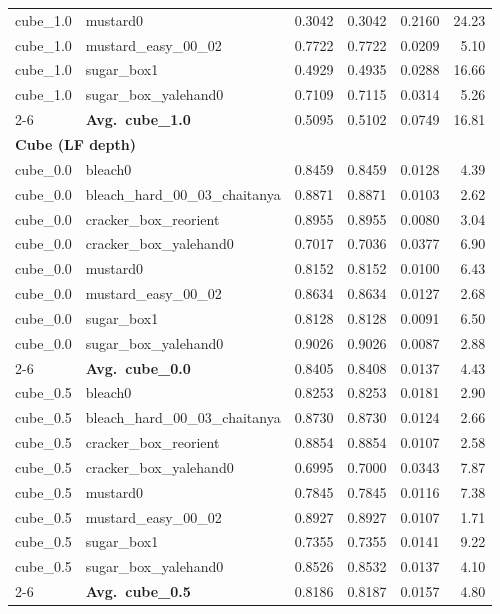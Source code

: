 \begin{longtable}{llrrrr}
  cube_1.0 & mustard0 & 0.3042 & 0.3042 & 0.2160 & 24.23 \\
  cube_1.0 & mustard\_easy\_00\_02 & 0.7722 & 0.7722 & 0.0209 & 5.10 \\
  cube_1.0 & sugar\_box1 & 0.4929 & 0.4935 & 0.0288 & 16.66 \\
  cube_1.0 & sugar\_box\_yalehand0 & 0.7109 & 0.7115 & 0.0314 & 5.26 \\
  \cmidrule{2-6}
  & \textbf{Avg.~cube_1.0} & 0.5095 & 0.5102 & 0.0749 & 16.81 \\
  \midrule
\multicolumn{6}{l}{\textbf{Cube (LF depth)}} \\
\midrule
  cube_0.0 & bleach0 & 0.8459 & 0.8459 & 0.0128 & 4.39 \\
  cube_0.0 & bleach\_hard\_00\_03\_chaitanya & 0.8871 & 0.8871 & 0.0103 & 2.62 \\
  cube_0.0 & cracker\_box\_reorient & 0.8955 & 0.8955 & 0.0080 & 3.04 \\
  cube_0.0 & cracker\_box\_yalehand0 & 0.7017 & 0.7036 & 0.0377 & 6.90 \\
  cube_0.0 & mustard0 & 0.8152 & 0.8152 & 0.0100 & 6.43 \\
  cube_0.0 & mustard\_easy\_00\_02 & 0.8634 & 0.8634 & 0.0127 & 2.68 \\
  cube_0.0 & sugar\_box1 & 0.8128 & 0.8128 & 0.0091 & 6.50 \\
  cube_0.0 & sugar\_box\_yalehand0 & 0.9026 & 0.9026 & 0.0087 & 2.88 \\
  \cmidrule{2-6}
  & \textbf{Avg.~cube_0.0} & 0.8405 & 0.8408 & 0.0137 & 4.43 \\
  \midrule
  cube_0.5 & bleach0 & 0.8253 & 0.8253 & 0.0181 & 2.90 \\
  cube_0.5 & bleach\_hard\_00\_03\_chaitanya & 0.8730 & 0.8730 & 0.0124 & 2.66 \\
  cube_0.5 & cracker\_box\_reorient & 0.8854 & 0.8854 & 0.0107 & 2.58 \\
  cube_0.5 & cracker\_box\_yalehand0 & 0.6995 & 0.7000 & 0.0343 & 7.87 \\
  cube_0.5 & mustard0 & 0.7845 & 0.7845 & 0.0116 & 7.38 \\
  cube_0.5 & mustard\_easy\_00\_02 & 0.8927 & 0.8927 & 0.0107 & 1.71 \\
  cube_0.5 & sugar\_box1 & 0.7355 & 0.7355 & 0.0141 & 9.22 \\
  cube_0.5 & sugar\_box\_yalehand0 & 0.8526 & 0.8532 & 0.0137 & 4.10 \\
  \cmidrule{2-6}
  & \textbf{Avg.~cube_0.5} & 0.8186 & 0.8187 & 0.0157 & 4.80 \\

\end{longtable}

